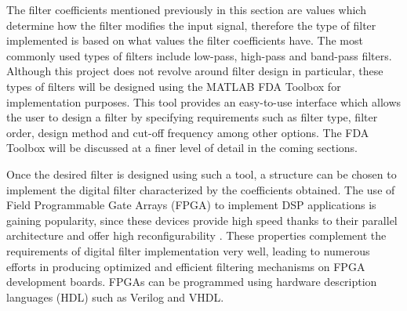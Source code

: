 \documentclass{csfyp}
\begin{document}
The filter coefficients mentioned previously in this section are values which determine how the filter modifies the input signal, therefore the type of filter implemented is based on what values the filter coefficients have. The most commonly used types of filters include low-pass, high-pass and band-pass filters. Although this project does not revolve around filter design in particular, these types of filters will be designed using the MATLAB FDA Toolbox for implementation purposes. This tool provides an easy-to-use interface which allows the user to design a filter by specifying requirements such as filter type, filter order, design method and cut-off frequency among other options. The FDA Toolbox will be discussed at a finer level of detail in the coming sections.

Once the desired filter is designed using such a tool, a structure can be chosen to implement the digital filter characterized by the coefficients obtained. The use of Field Programmable Gate Arrays (FPGA) to implement DSP applications is gaining popularity, since these devices provide high speed thanks to their parallel architecture and offer high reconfigurability \cite{nagakishore2012fpga}. These properties complement the requirements of digital filter implementation very well, leading to numerous efforts in producing optimized and efficient filtering mechanisms on FPGA development boards. FPGAs can be programmed using hardware description languages (HDL) such as Verilog and VHDL.
\end{document}
